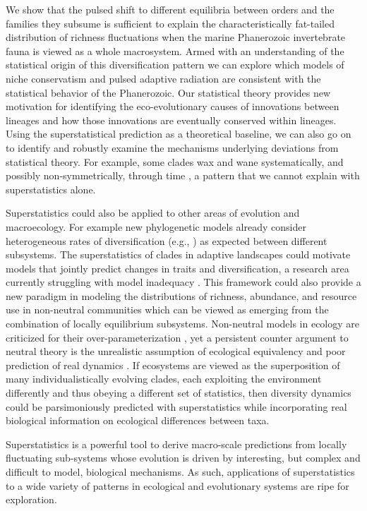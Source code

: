 \documentclass[12pt]{article}
\let\citep=\cite
\begin{document}
We show that the pulsed shift to different equilibria between orders
and the families they subsume is sufficient to explain the
characteristically fat-tailed distribution of richness fluctuations
when the marine Phanerozoic invertebrate fauna is viewed as a whole
macrosystem.  Armed with an understanding of the statistical origin of
this diversification pattern we can explore which models of niche
conservatism and pulsed adaptive radiation are consistent with the
statistical behavior of the Phanerozoic. Our statistical theory
provides new motivation for identifying the eco-evolutionary causes of
innovations between lineages and how those innovations are eventually
conserved within lineages. Using the superstatistical prediction as a
theoretical baseline, we can also go on to identify and robustly
examine the mechanisms underlying deviations from statistical
theory. For example, some clades wax and wane systematically, and
possibly non-symmetrically, through time \citep{liow2007,
  foote2008paleobiol, quental2013}, a pattern that we cannot explain
with superstatistics alone.

Superstatistics could also be applied to other areas of evolution and
macroecology.  For example new phylogenetic models already consider
heterogeneous rates of diversification (e.g., \citep{rabosky2014}) as
expected between different subsystems. The superstatistics of clades
in adaptive landscapes could motivate models that jointly predict
changes in traits and diversification, a research area currently
struggling with model inadequacy \citep{rabosky2017fisse}. This
framework could also provide a new paradigm in modeling the
distributions of richness, abundance, and resource use in non-neutral
communities which can be viewed as emerging from the combination of
locally equilibrium subsystems. Non-neutral models in ecology are
criticized for their over-parameterization \citep{rosindell2011}, yet
a persistent counter argument to neutral theory \citep{hubbell2001} is
the unrealistic assumption of ecological equivalency and poor
prediction of real dynamics \citep{rosindell2011}. If ecosystems are
viewed as the superposition of many individualistically evolving
clades, each exploiting the environment differently and thus obeying a
different set of statistics, then diversity dynamics could be
parsimoniously predicted with superstatistics while incorporating real
biological information on ecological differences between taxa.

Superstatistics is a powerful tool to derive macro-scale predictions
from locally fluctuating sub-systems whose evolution is driven by
interesting, but complex and difficult to model, biological
mechanisms. As such, applications of superstatistics to a wide variety
of patterns in ecological and evolutionary systems are ripe for
exploration.
\end{document}
